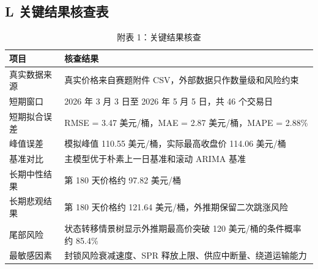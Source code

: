 \subsection*{L 关键结果核查表}

\begin{table}[!htbp]
\centering
\caption*{附表 1：关键结果核查}
\begin{tabularx}{\linewidth}{lX}
\toprule
项目 & 核查结果 \\
\midrule
真实数据来源 & 真实价格来自赛题附件 CSV，外部数据只作数量级和风险约束 \\
短期窗口 & 2026 年 3 月 3 日至 2026 年 5 月 5 日，共 46 个交易日 \\
短期拟合误差 & RMSE = 3.47 美元/桶，MAE = 2.87 美元/桶，MAPE = 2.88\% \\
峰值误差 & 模拟峰值 110.55 美元/桶，实际最高收盘价 114.06 美元/桶 \\
基准对比 & 主模型优于朴素上一日基准和滚动 ARIMA 基准 \\
长期中性结果 & 第 180 天价格约 97.82 美元/桶 \\
长期悲观结果 & 第 180 天价格约 121.64 美元/桶，外推期保留二次跳涨风险 \\
尾部风险 & 状态转移情景树显示外推期最高价突破 120 美元/桶的条件概率约 85.4\% \\
最敏感因素 & 封锁风险衰减速度、SPR 释放上限、供应中断量、绕道运输能力 \\
\bottomrule
\end{tabularx}
\end{table}
